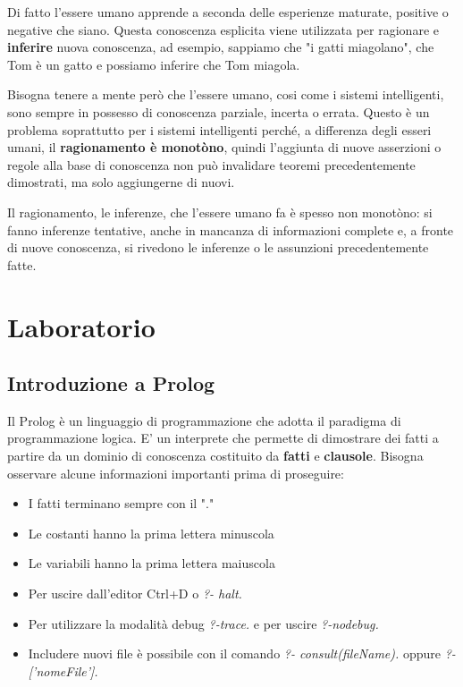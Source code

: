 Di fatto l'essere umano apprende a seconda delle esperienze maturate, positive o negative che siano.
Questa conoscenza esplicita viene utilizzata per ragionare e \textbf{inferire} nuova conoscenza, ad esempio, sappiamo che "i gatti miagolano", che Tom è un gatto e possiamo inferire che Tom miagola.

Bisogna tenere a mente però che l'essere umano, cosi come i sistemi intelligenti, sono sempre in possesso di conoscenza parziale, incerta o errata. Questo è un problema soprattutto per i sistemi intelligenti perché, a differenza degli esseri umani, il \textbf{ragionamento è monotòno}, quindi l'aggiunta di nuove asserzioni o regole alla base di conoscenza non può invalidare teoremi precedentemente dimostrati, ma solo aggiungerne di nuovi.

Il ragionamento, le inferenze, che l'essere umano fa è spesso non monotòno: si fanno inferenze tentative, anche in mancanza di informazioni complete e, a fronte di nuove conoscenza, si rivedono le inferenze o le assunzioni precedentemente fatte.

\section{Laboratorio}
\subsection{Introduzione a Prolog}
Il Prolog è un linguaggio di programmazione che adotta il paradigma di programmazione logica. E' un interprete che permette di dimostrare dei fatti a partire da un dominio di conoscenza costituito da \textbf{fatti} e \textbf{clausole}.
Bisogna osservare alcune informazioni importanti prima di proseguire: 
\begin{itemize}
    \item I fatti terminano sempre con il "."
    \item Le costanti hanno la prima lettera minuscola
    \item Le variabili hanno la prima lettera maiuscola
    \item Per uscire dall'editor Ctrl+D o \textit{?- halt.}
    \item Per utilizzare la modalità debug \textit{?-trace.} e per uscire \textit{?-nodebug.}
    \item Includere nuovi file è possibile con il comando \textit{?- consult(fileName).} oppure \textit{?- ['nomeFile'].}
\end{itemize}

